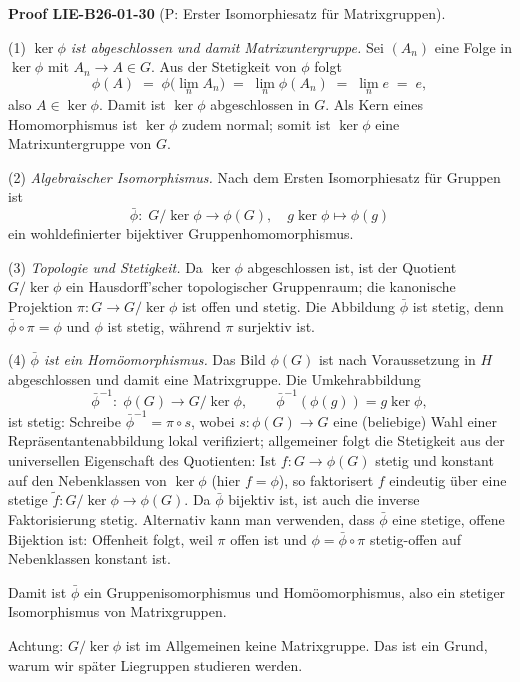 \documentclass[10pt, letterpaper]{article}
\newcommand{\CustomHeading}[3]{%
  \par\medskip\noindent%
  \textbf{#1 #2} \textnormal{(#3)}.\enskip%
}
\newenvironment{PROOF}[2]{\begin{unitbox}\CustomHeading{Proof}{#1}{#2}}{\end{unitbox}}
\begin{document}
\begin{PROOF}{LIE-B26-01-30}{P: Erster Isomorphiesatz für Matrixgruppen}
(1) \emph{$\ker\phi$ ist abgeschlossen und damit Matrixuntergruppe.}
Sei $(A_n)$ eine Folge in $\ker\phi$ mit $A_n \to A \in G$. Aus der Stetigkeit von $\phi$ folgt
\[
\phi(A)\;=\;\phi\!\big(\lim_n A_n\big)\;=\;\lim_n \phi(A_n)\;=\;\lim_n e\;=\;e,
\]
also $A\in\ker\phi$. Damit ist $\ker\phi$ abgeschlossen in $G$. Als Kern eines Homomorphismus ist $\ker\phi$ zudem normal; somit ist $\ker\phi$ eine Matrixuntergruppe von $G$.

\smallskip
(2) \emph{Algebraischer Isomorphismus.}
Nach dem Ersten Isomorphiesatz für Gruppen ist
\[
\bar\phi:\; G/\ker\phi \to \phi(G),\quad g\ker\phi \mapsto \phi(g)
\]
ein wohldefinierter bijektiver Gruppenhomomorphismus.

\smallskip
(3) \emph{Topologie und Stetigkeit.}
Da $\ker\phi$ abgeschlossen ist, ist der Quotient $G/\ker\phi$ ein Hausdorff’scher topologischer Gruppenraum; die kanonische Projektion
$\pi:G\to G/\ker\phi$ ist offen und stetig.
Die Abbildung $\bar\phi$ ist stetig, denn $\bar\phi\circ\pi=\phi$ und $\phi$ ist stetig, während $\pi$ surjektiv ist.

\smallskip
(4) \emph{$\bar\phi$ ist ein Homöomorphismus.}
Das Bild $\phi(G)$ ist nach Voraussetzung in $H$ abgeschlossen und damit eine Matrixgruppe. Die Umkehrabbildung
\[
\bar\phi^{-1}:\; \phi(G)\to G/\ker\phi,\qquad \bar\phi^{-1}(\phi(g))=g\ker\phi,
\]
ist stetig: Schreibe $\bar\phi^{-1} = \pi\circ s$, wobei $s:\phi(G)\to G$ eine (beliebige) Wahl einer Repräsentantenabbildung lokal verifiziert; allgemeiner folgt die Stetigkeit aus der universellen Eigenschaft des Quotienten: Ist $f:G\to \phi(G)$ stetig und konstant auf den Nebenklassen von $\ker\phi$ (hier $f=\phi$), so faktorisert $f$ eindeutig über eine stetige $\tilde f:G/\ker\phi\to \phi(G)$. Da $\bar\phi$ bijektiv ist, ist auch die inverse Faktorisierung stetig. Alternativ kann man verwenden, dass $\bar\phi$ eine stetige, offene Bijektion ist: Offenheit folgt, weil $\pi$ offen ist und $\phi=\bar\phi\circ\pi$ stetig-offen auf Nebenklassen konstant ist.

\smallskip
Damit ist $\bar\phi$ ein Gruppenisomorphismus und Homöomorphismus, also ein stetiger Isomorphismus von Matrixgruppen.
\end{PROOF}


Achtung: $G / \operatorname{ker} \phi$ ist im Allgemeinen keine Matrixgruppe. Das ist ein Grund, warum wir später Liegruppen studieren werden.
\end{document}
